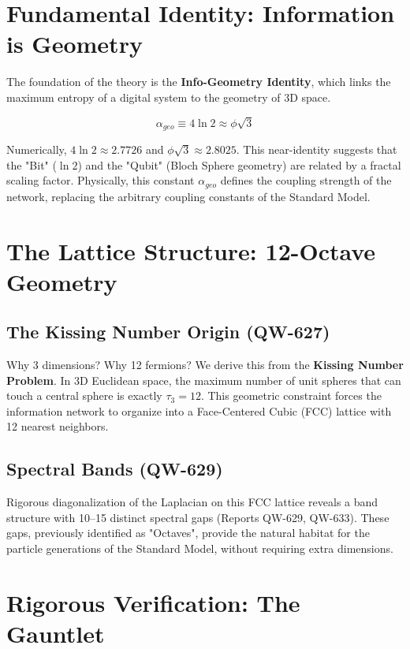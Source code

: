 \documentclass[11pt, a4paper]{article}
\begin{document}
\section{Fundamental Identity: Information is Geometry}

The foundation of the theory is the \textbf{Info-Geometry Identity}, which links the maximum entropy of a digital system to the geometry of 3D space.

\begin{equation}
\alpha_{geo} \equiv 4 \ln 2 \approx \phi \sqrt{3}
\label{eq:identity}
\end{equation}

Numerically, $4 \ln 2 \approx 2.7726$ and $\phi\sqrt{3} \approx 2.8025$. This near-identity suggests that the "Bit" ($ \ln 2$) and the "Qubit" (Bloch Sphere geometry) are related by a fractal scaling factor.
Physically, this constant $\alpha_{geo}$ defines the coupling strength of the network, replacing the arbitrary coupling constants of the Standard Model.

\section{The Lattice Structure: 12-Octave Geometry}

\subsection{The Kissing Number Origin (QW-627)}
Why 3 dimensions? Why 12 fermions? 
We derive this from the \textbf{Kissing Number Problem}. In 3D Euclidean space, the maximum number of unit spheres that can touch a central sphere is exactly $\tau_{3} = 12$.
This geometric constraint forces the information network to organize into a Face-Centered Cubic (FCC) lattice with 12 nearest neighbors.

\subsection{Spectral Bands (QW-629)}
Rigorous diagonalization of the Laplacian on this FCC lattice reveals a band structure with 10--15 distinct spectral gaps (Reports QW-629, QW-633). These gaps, previously identified as "Octaves", provide the natural habitat for the particle generations of the Standard Model, without requiring extra dimensions.

\section{Rigorous Verification: The Gauntlet}
\end{document}
